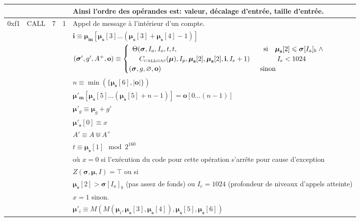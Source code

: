 \documentclass[9pt,oneside]{amsart}
\begin{document}
\begin{tabular*}{\columnwidth}[h]{rlrrl}
&&&& Ainsi l'ordre des opérandes est: valeur, décalage d'entrée, taille d'entrée. \\
\midrule
0xf1 & {\small CALL} & 7 & 1 & Appel de message à l'intérieur d'un compte. \\
&&&& $\mathbf{i} \equiv \boldsymbol{\mu}_\mathbf{m}[ \boldsymbol{\mu}_\mathbf{s}[3] \dots (\boldsymbol{\mu}_\mathbf{s}[3] + \boldsymbol{\mu}_\mathbf{s}[4] - 1) ]$ \\
&&&& $(\boldsymbol{\sigma}', g', A^+, \mathbf{o}) \equiv \begin{cases}\begin{array}{l}\Theta(\boldsymbol{\sigma}, I_a, I_o, t, t,\\ \quad C_{\text{\tiny CALLGAS}}(\boldsymbol{\mu}), I_p, \boldsymbol{\mu}_\mathbf{s}[2], \boldsymbol{\mu}_\mathbf{s}[2], \mathbf{i}, I_e + 1)\end{array} & \begin{array}{l}\text{si} \quad \boldsymbol{\mu}_\mathbf{s}[2] \leqslant \boldsymbol{\sigma}[I_a]_b \;\wedge \\ \quad\quad I_e < 1024\end{array}\\ (\boldsymbol{\sigma}, g, \varnothing, \mathbf{o}) & \text{sinon} \end{cases}$ \\
&&&& $n \equiv \min(\{ \boldsymbol{\mu}_\mathbf{s}[6], |\mathbf{o}|\})$ \\
&&&& $\boldsymbol{\mu}'_\mathbf{m}[ \boldsymbol{\mu}_\mathbf{s}[5] \dots (\boldsymbol{\mu}_\mathbf{s}[5] + n - 1) ] = \mathbf{o}[0 \dots (n - 1)]$ \\
&&&& $\boldsymbol{\mu}'_g \equiv \boldsymbol{\mu}_g + g'$ \\
&&&& $\boldsymbol{\mu}'_\mathbf{s}[0] \equiv x$ \\
&&&& $A' \equiv A \Cup A^+$ \\
&&&& $t \equiv \boldsymbol{\mu}_\mathbf{s}[1] \mod 2^{160}$ \\
&&&& où $x=0$ si l'exécution du code pour cette opération s'arrête pour cause d'exception \\
&&&& $Z(\boldsymbol{\sigma}, \boldsymbol{\mu}, I) = \top$ ou si  \\
&&&& $\boldsymbol{\mu}_\mathbf{s}[2] > \boldsymbol{\sigma}[I_a]_b$ (pas assez de fonds) ou $I_e = 1024$ (profondeur de niveaux d'appels atteinte)\\
&&&& $x=1$ sinon. \\
&&&& $\boldsymbol{\mu}'_i \equiv M(M(\boldsymbol{\mu}_i, \boldsymbol{\mu}_\mathbf{s}[3], \boldsymbol{\mu}_\mathbf{s}[4]), \boldsymbol{\mu}_\mathbf{s}[5], \boldsymbol{\mu}_\mathbf{s}[6])$ \\

\end{tabular*}
\end{document}
